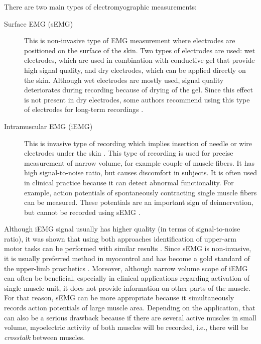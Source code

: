 There are two main types of electromyographic measurements: 
\begin{description}
\item[Surface EMG (sEMG)] This is non-invasive type of EMG measurement where electrodes are positioned on the surface of the skin. Two types of electrodes are used: wet electrodes, which are used in combination with conductive gel that provide high signal quality, and dry electrodes, which can be applied directly on the skin. Although wet electrodes are mostly used, signal quality deteriorates during recording because of drying of the gel. Since this effect is not present in dry electrodes, some authors recommend using this type of electrodes for long-term recordings \citep{Merletti2009, Hakonen2015}.

\item[Intramuscular EMG (iEMG)] This is invasive type of recording which implies insertion of needle or wire electrodes under the skin \citep{Marateb1999}. This type of recording is used for precise measurement of narrow volume, for example couple of muscle fibers. It has high signal-to-noise ratio, but causes discomfort in subjects. It is often used in clinical practice because it can detect abnormal functionality. For example, action potentials of spontaneously contracting single muscle fibers can be measured. These potentials are an important sign of deinnervation, but cannot be recorded using sEMG \citep{Merletti-book}.
\end{description}

Although iEMG signal usually has higher quality (in terms of signal-to-noise ratio), it was shown that using both approaches identification of upper-arm motor tasks can be performed with similar results \citep{Hargrove2007}. Since sEMG is non-invasive, it is usually preferred method in myocontrol and has become a gold standard of the upper-limb prosthetics \citep{Kamavuako2013}. Moreover, although narrow volume scope of iEMG can often be beneficial, especially in clinical applications regarding activation of single muscle unit, it does not provide information on other parts of the muscle. For that reason, sEMG can be more appropriate because it simultaneously records action potentials of large muscle area. Depending on the application, that can also be a serious drawback because if there are several active muscles in small volume, myoelectric activity of both muscles will be recorded, i.e., there will be \emph{crosstalk} between muscles. 


